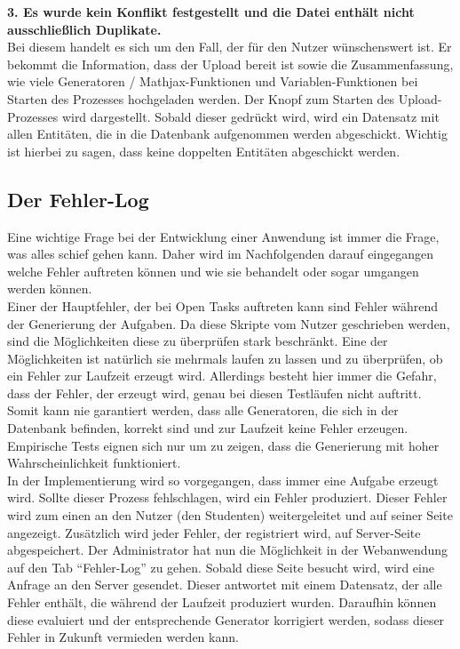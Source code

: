\noindent \textbf{3. Es wurde kein Konflikt festgestellt und die Datei enthält nicht ausschließlich Duplikate.} \\
Bei diesem handelt es sich um den Fall, der für den Nutzer wünschenswert ist. Er bekommt die Information, dass der Upload bereit ist sowie die Zusammenfassung, wie viele Generatoren / Mathjax-Funktionen und Variablen-Funktionen bei Starten des Prozesses hochgeladen werden. Der Knopf zum Starten des Upload-Prozesses wird dargestellt. Sobald dieser gedrückt wird, wird ein Datensatz mit allen Entitäten, die in die Datenbank aufgenommen werden abgeschickt. Wichtig ist hierbei zu sagen, dass keine doppelten Entitäten abgeschickt werden.\\



\subsection{Der Fehler-Log}

Eine wichtige Frage bei der Entwicklung einer Anwendung ist immer die Frage, was alles schief gehen kann. Daher wird im Nachfolgenden darauf eingegangen welche Fehler auftreten können und wie sie behandelt oder sogar umgangen werden können.\\
Einer der Hauptfehler, der bei Open Tasks auftreten kann sind Fehler während der Generierung der Aufgaben. Da diese Skripte vom Nutzer geschrieben werden, sind die Möglichkeiten diese zu überprüfen stark beschränkt. Eine der Möglichkeiten ist natürlich sie mehrmals laufen zu lassen und zu überprüfen, ob ein Fehler zur Laufzeit erzeugt wird. Allerdings besteht hier immer die Gefahr, dass der Fehler, der erzeugt wird, genau bei diesen Testläufen nicht auftritt. Somit kann nie garantiert werden, dass alle Generatoren, die sich in der Datenbank befinden, korrekt sind und zur Laufzeit keine Fehler erzeugen. Empirische Tests eignen sich nur um zu zeigen, dass die Generierung mit hoher Wahrscheinlichkeit funktioniert.  \\

In der Implementierung wird so vorgegangen, dass immer eine Aufgabe erzeugt wird. Sollte dieser Prozess fehlschlagen, wird ein Fehler produziert. Dieser Fehler wird zum einen an den Nutzer (den Studenten) weitergeleitet und auf seiner Seite angezeigt. Zusätzlich wird jeder Fehler, der registriert wird, auf Server-Seite abgespeichert. Der Administrator hat nun die Möglichkeit in der Webanwendung auf den Tab ``Fehler-Log'' zu gehen. Sobald diese Seite besucht wird, wird eine Anfrage an den Server gesendet. Dieser antwortet mit einem Datensatz, der alle Fehler enthält, die während der Laufzeit produziert wurden. Daraufhin können diese evaluiert und der entsprechende Generator korrigiert werden, sodass dieser Fehler in Zukunft vermieden werden kann. \\

